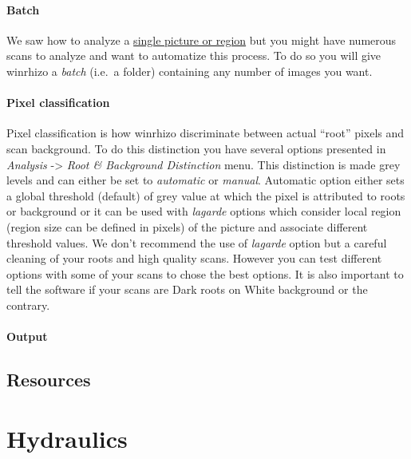 \documentclass[
  12pt,
  american,
  a4paper,
  extrafontsizes,onecolumn,openright
  ]{memoir}
\begin{document}
\hypertarget{batch}{%
\subsubsection{Batch}\label{batch}}

We saw how to analyze a \protect\hyperlink{first-analysis}{single picture or region} but you might have numerous scans to analyze and want to automatize this process.
To do so you will give winrhizo a \emph{batch} (i.e.~a folder) containing any number of images you want.

\hypertarget{pixel-classification}{%
\subsubsection{Pixel classification}\label{pixel-classification}}

Pixel classification is how winrhizo discriminate between actual \enquote{root} pixels and scan background.
To do this distinction you have several options presented in \emph{Analysis} -\textgreater{} \emph{Root \& Background Distinction} menu.
This distinction is made grey levels and can either be set to \emph{automatic} or \emph{manual}.
Automatic option either sets a global threshold (default) of grey value at which the pixel is attributed to roots or background or it can be used with \emph{lagarde} options which consider local region (region size can be defined in pixels) of the picture and associate different threshold values.
We don't recommend the use of \emph{lagarde} option but a careful cleaning of your roots and high quality scans.
However you can test different options with some of your scans to chose the best options.
It is also important to tell the software if your scans are Dark roots on White background or the contrary.

\hypertarget{output}{%
\subsubsection{Output}\label{output}}

\hypertarget{resources}{%
\section{Resources}\label{resources}}

\hypertarget{hydraulics}{%
\chapter{Hydraulics}\label{hydraulics}}
\end{document}
